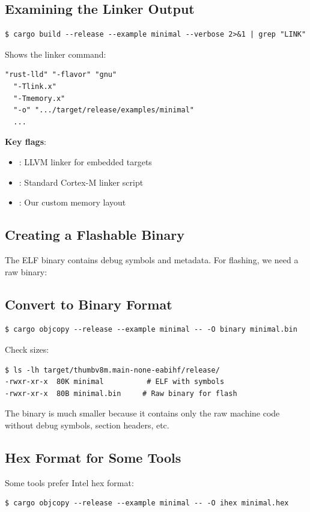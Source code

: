 \subsection{Examining the Linker Output}
\begin{verbatim}
$ cargo build --release --example minimal --verbose 2>&1 | grep "LINK"
\end{verbatim}

Shows the linker command:
\begin{verbatim}
"rust-lld" "-flavor" "gnu"
  "-Tlink.x"
  "-Tmemory.x"
  "-o" ".../target/release/examples/minimal"
  ...
\end{verbatim}

\textbf{Key flags}:
\begin{itemize}
    \item {}: LLVM linker for embedded targets
    \item {}: Standard Cortex-M linker script
    \item {}: Our custom memory layout
\end{itemize}

\subsection{Creating a Flashable Binary}
\label{sec:flashable-binary}

The ELF binary contains debug symbols and metadata. For flashing, we need a raw binary:
\subsection{Convert to Binary Format}
\begin{verbatim}
$ cargo objcopy --release --example minimal -- -O binary minimal.bin
\end{verbatim}

Check sizes:
\begin{verbatim}
$ ls -lh target/thumbv8m.main-none-eabihf/release/
-rwxr-xr-x  80K minimal          # ELF with symbols
-rwxr-xr-x  80B minimal.bin     # Raw binary for flash
\end{verbatim}

The binary is much smaller because it contains only the raw machine code without debug symbols, section headers, etc.
\subsection{Hex Format for Some Tools}
Some tools prefer Intel hex format:
\begin{verbatim}
$ cargo objcopy --release --example minimal -- -O ihex minimal.hex
\end{verbatim}

